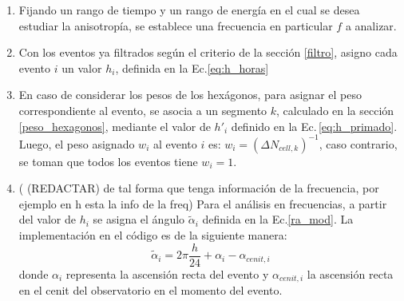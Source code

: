         \begin{enumerate}
        \item Fijando un rango de tiempo y un rango de energía en el cual se desea estudiar la anisotropía, se establece una frecuencia en particular $f$ a analizar.

        \item Con los eventos ya filtrados según el criterio de la sección \ref{filtro}, asigno cada evento $i$ un valor $h_i$, definida en la Ec.\ref{eq:h_horas}

        \item En caso de considerar los pesos de los hexágonos, para asignar el peso correspondiente al evento, se asocia a un segmento $k$, calculado en la sección \ref{peso_hexagonos}, mediante el valor de $h'_i$ definido en la Ec.\,\ref{eq:h_primado}. Luego, el peso asignado $w_i$  al evento $i$ es: $ w_{i}= (\Delta N_{cell,k})^{-1}$, caso contrario, se toman que todos los eventos tiene $w_i=1$.
        
        \item ( (REDACTAR) de tal forma que tenga información de la frecuencia, por ejemplo en h esta la info de la freq) Para el análisis en frecuencias, a partir del valor de $h_i$ se asigna el ángulo $\tilde{\alpha}_i$ definida en la Ec.\ref{ra_mod}. La implementación en el código es de la siguiente manera: 
        \begin{equation}
         \tilde{\alpha}_i = 2\pi \frac{h}{24} + \alpha_i -\alpha_{cenit,i}
        \end{equation}
        donde $\alpha_i$  representa la ascensión recta del evento y $\alpha_{cenit,i}$ la ascensión recta en el cenit del observatorio en el momento del evento. %


\end{enumerate}
